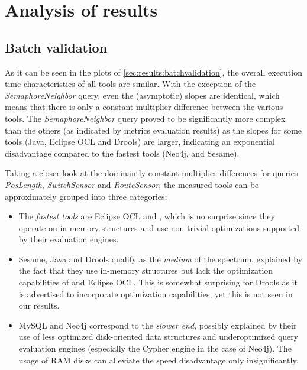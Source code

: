 \section{Analysis of results}
\label{sec:results:analysis}

\subsection{Batch validation}

% 

As it can be seen in the plots of \autoref{sec:results:batchvalidation}, the overall execution time characteristics of all tools are similar. With the exception of the \emph{SemaphoreNeighbor} query, even the (asymptotic) slopes are identical, which means that there is only a constant multiplier difference between the various tools. The \emph{SemaphoreNeighbor} query proved to be significantly more complex than the others (as indicated by metrics evaluation results) as the slopes for some tools (Java, Eclipse OCL and Drools) are larger, indicating an exponential disadvantage compared to the fastest tools (\eg Neo4j, \eiq and Sesame).

Taking a closer look at the dominantly constant-multiplier differences for queries \emph{PosLength}, \emph{SwitchSensor} and \emph{RouteSensor}, the measured tools can be approximately grouped into three categories:
\begin{itemize}
  \item The \emph{fastest tools} are Eclipse OCL and \eiq, which is no surprise since they operate on in-memory structures and use non-trivial optimizations supported by their evaluation engines.
  \item Sesame, Java and Drools qualify as the \emph{medium} of the spectrum, explained by the fact that they use in-memory structures but lack the optimization capabilities of \eiq and Eclipse OCL. This is somewhat surprising for Drools as it is advertised to incorporate optimization capabilities, yet this is not seen in our results.
  \item MySQL and Neo4j correspond to the \emph{slower end}, possibly explained by their use of less optimized disk-oriented data structures and underoptimized query evaluation engines (especially the Cypher engine in the case of Neo4j). The usage of RAM disks can alleviate the speed disadvantage only insignificantly.
\end{itemize}


